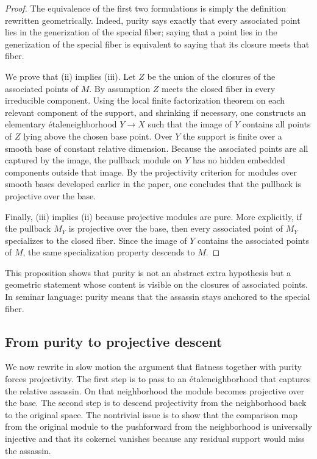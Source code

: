 \documentclass[11pt,oneside]{article}
\newcommand{\etale}{\'etale}
\begin{document}
\begin{proof}
The equivalence of the first two formulations is simply the definition rewritten geometrically.  Indeed, purity says exactly that every associated point lies in the generization of the special fiber; saying that a point lies in the generization of the special fiber is equivalent to saying that its closure meets that fiber.

We prove that (ii) implies (iii).  Let $Z$ be the union of the closures of the associated points of $M$.  By assumption $Z$ meets the closed fiber in every irreducible component.  Using the local finite factorization theorem on each relevant component of the support, and shrinking if necessary, one constructs an elementary \etale neighborhood $Y\to X$ such that the image of $Y$ contains all points of $Z$ lying above the chosen base point.  Over $Y$ the support is finite over a smooth base of constant relative dimension.  Because the associated points are all captured by the image, the pullback module on $Y$ has no hidden embedded components outside that image.  By the projectivity criterion for modules over smooth bases developed earlier in the paper, one concludes that the pullback is projective over the base.

Finally, (iii) implies (ii) because projective modules are pure.  More explicitly, if the pullback $M_Y$ is projective over the base, then every associated point of $M_Y$ specializes to the closed fiber.  Since the image of $Y$ contains the associated points of $M$, the same specialization property descends to $M$.
\end{proof}

This proposition shows that purity is not an abstract extra hypothesis but a geometric statement whose content is visible on the closures of associated points.  In seminar language: purity means that the assassin stays anchored to the special fiber.

\subsection{From purity to projective descent}

We now rewrite in slow motion the argument that flatness together with purity forces projectivity.  The first step is to pass to an \etale neighborhood that captures the relative assassin.  On that neighborhood the module becomes projective over the base.  The second step is to descend projectivity from the neighborhood back to the original space.  The nontrivial issue is to show that the comparison map from the original module to the pushforward from the neighborhood is universally injective and that its cokernel vanishes because any residual support would miss the assassin.
\end{document}

